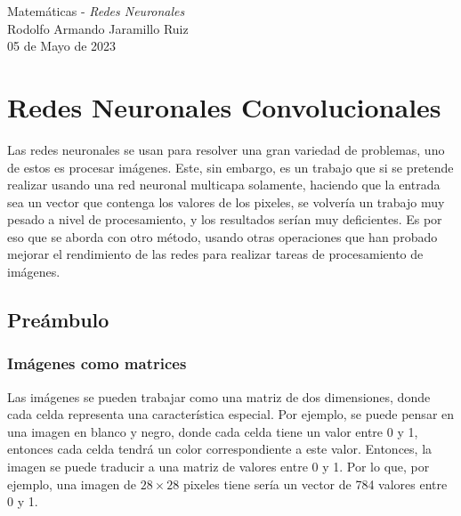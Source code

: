\documentclass[14pt,a4paper]{report}
\begin{document}
\newcommand{\commentedbox}[2]{%
  \mbox{
    \begin{tabular}[t]{@{}c@{}}
    $\boxed{\displaystyle#1}$\\
    #2
    \end{tabular}%
  }%
}
\pagestyle{fancy}
\Large{Matemáticas - \textit{Redes Neuronales}}\\
\normalsize
Rodolfo Armando Jaramillo Ruiz\\
05 de Mayo de 2023\\
\section*{Redes Neuronales Convolucionales}

Las redes neuronales se usan para resolver una gran variedad de problemas, uno de estos es procesar imágenes. Este, sin embargo, es un trabajo que si se pretende realizar usando una red neuronal multicapa solamente, haciendo que la entrada sea un vector que contenga los valores de los pixeles, se volvería un trabajo muy pesado a nivel de procesamiento, y los resultados serían muy deficientes. Es por eso que se aborda con otro método, usando otras operaciones que han probado mejorar el rendimiento de las redes para realizar tareas de procesamiento de imágenes.

\subsection*{Preámbulo}

\subsubsection*{Imágenes como matrices}

Las imágenes se pueden trabajar como una matriz de dos dimensiones, donde cada celda representa una característica especial. Por ejemplo, se puede pensar en una imagen en blanco y negro, donde cada celda tiene un valor entre 0 y 1, entonces cada celda tendrá un color correspondiente a este valor. Entonces, la imagen se puede traducir a una matriz de valores entre 0 y 1. Por lo que, por ejemplo, una imagen de $28\times28$ pixeles tiene sería un vector de 784 valores entre 0 y 1.
\end{document}
